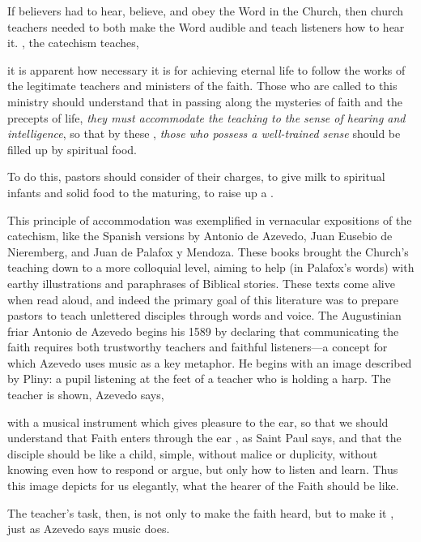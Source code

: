 
If believers had to hear, believe, and obey the Word in the Church, then church
teachers needed to both make the Word audible and teach listeners how to hear
it. 
, the
catechism teaches, 
\begin{quoting}
    it is apparent how necessary it is for achieving eternal life to follow the
    works of the legitimate teachers and ministers of the faith. 
    \Dots{} Those who are called to this ministry should understand that in
    passing along the mysteries of faith and the precepts of life, \emph{they
    must accommodate the teaching to the sense of hearing and intelligence}, so
    that by these , \emph{those who possess a
    well-trained sense} should be filled up by spiritual food.%
        \Autocite[2, 8--9 (emphasis added)]{Catholic:Catechismus1614}
\end{quoting}
To do this, pastors should consider  of their charges, to give milk to spiritual infants and solid food
to the maturing, to raise up a .%
    \Autocite[8]{Catholic:Catechismus1614}

This principle of accommodation was exemplified in vernacular expositions of
the catechism, like the Spanish versions by Antonio de Azevedo, Juan Eusebio de
Nieremberg, and Juan de Palafox y Mendoza.%
    \Autocites
    {Azevedo:Catecismo}
    {Nieremberg:PracticaCatecismo}
    {Palafox:Bocados}
These books brought the Church's teaching down to a more colloquial level,
aiming to help  (in Palafox's words) with
earthy illustrations and paraphrases of Biblical stories.
These texts come alive when read aloud, and indeed the primary goal of this
literature was to prepare pastors to teach unlettered disciples through words
and voice.
The Augustinian friar Antonio de Azevedo begins his 1589  by declaring that communicating the faith requires
both trustworthy teachers and faithful listeners---a concept for which Azevedo
uses music as a key metaphor.
He begins with an image described by Pliny: a pupil listening at the feet of a
teacher who is holding a harp.
The teacher is shown, Azevedo says,
\begin{quoting}
    with a musical instrument which gives pleasure to the ear, so that we should
    understand that Faith enters through the ear , as Saint Paul
    says, and that the disciple should be like a child, simple, without malice
    or duplicity, without knowing even how to respond or argue, but only how to
    listen and learn.
    Thus this image depicts for us elegantly, what the hearer of the Faith
    should be like.%
        \Autocite[]{Azevedo:Catecismo}
\end{quoting}
The teacher's task, then, is not only to make the faith heard, but to make it
, just as Azevedo says music does.

